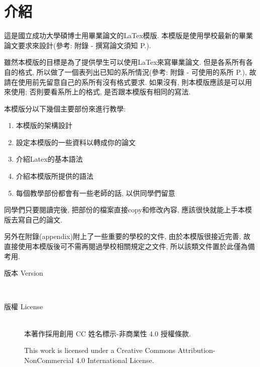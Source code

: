 
\section{介紹}

這是國立成功大學碩博士用畢業論文的LaTex模版. 本模版是使用學校最新的畢業論文要求來設計(參考: 附錄 - 撰寫論文須知 P.\pageref{appendix:thesis-spec}).

雖然本模版的目標是為了提供學生可以使用LaTex來寫畢業論文. 但是各系所有各自的格式, 所以做了一個表列出已知的系所情況(參考: 附錄 - 可使用的系所 P.\pageref{appendix:acceptable-dept}), 故請在使用前先留意自己的系所有沒有格式要求. 如果沒有, 則本模版應該是可以用來使用; 否則要看系所上的格式, 是否跟本模版有相同的寫法.

本模版分以下幾個主要部份來進行教學:
\begin{enumerate}
  \item 本模版的架構設計
  \item 設定本模版的一些資料以轉成你的論文
  \item 介紹Latex的基本語法
  \item 介紹本模版所提供的語法
  \item 每個教學部份都會有一些老師的話, 以供同學們留意
\end{enumerate}
同學們只要閱讀完後, 把部份的檔案直接copy和修改內容, 應該很快就能上手本模版去寫自己的論文.

另外在附錄(appendix)附上了一些重要的學校的文件, 由於本模版很接近完善, 故直接使用本模版後可不需再閱過學校相關規定之文件, 所以該類文件置於此僅為備考用.

\newpage

\begin{description}
  \item[版本 Version] \hfill \\
    \ThisThesisVersion

  \item[版權 License] \hfill \\
    本著作採用創用 CC 姓名標示-非商業性 4.0 授權條款.

    This work is licensed under a Creative Commons Attribution-NonCommercial 4.0 International License.

\end{description}

\EndChapter
